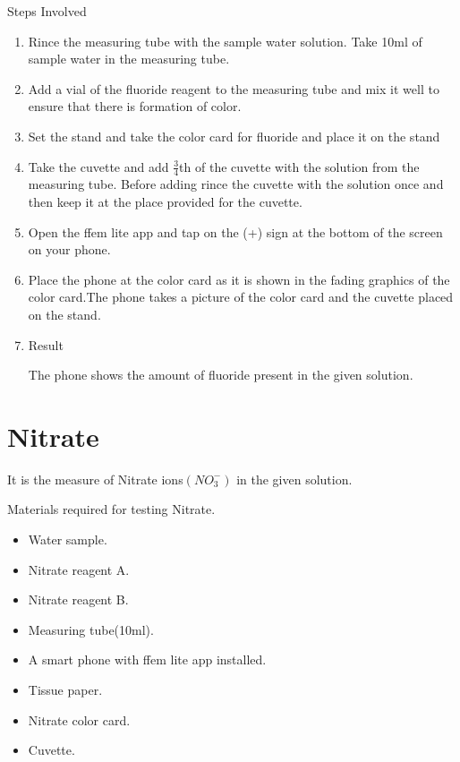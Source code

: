 \documentclass{article}
\begin{document}
 \begin{large}
 Steps Involved 
 \end{large}
 
 \begin{enumerate}
 \item Rince the measuring tube with the sample water solution.
 Take 10ml of sample water in the measuring tube.
 \item Add a vial of the fluoride reagent to the measuring tube and mix it well to ensure that there is formation of color.
 \item Set the stand and take the color card for fluoride and place it on the stand 
 \item Take the cuvette and add $\frac{3}{4}$th of the cuvette with the solution from the measuring tube. Before adding rince the cuvette with the solution once and then keep it at the place provided for the cuvette.
 
 \item Open the ffem lite app and tap on the (+) sign at the bottom of the screen on your phone.
 \item Place the phone at the color card as it is shown in the fading graphics of the color card.The phone takes a picture of the color card and the cuvette placed on the stand.
 \item Result 
 
 The phone shows the amount of fluoride present in the given solution.
 
 \end{enumerate}
    


\section{Nitrate}
    
It is the measure of Nitrate ions$(NO_3^-)$ in the given solution.
    
Materials required for testing Nitrate.
  \begin{itemize}
  \item Water sample.
  \item  Nitrate reagent A.
  \item Nitrate reagent B.
  \item Measuring tube(10ml).
  \item A smart phone with ffem lite app installed.
  \item Tissue paper.
  \item  Nitrate color card.
  \item  Cuvette.
  \end{itemize}
\end{document}
